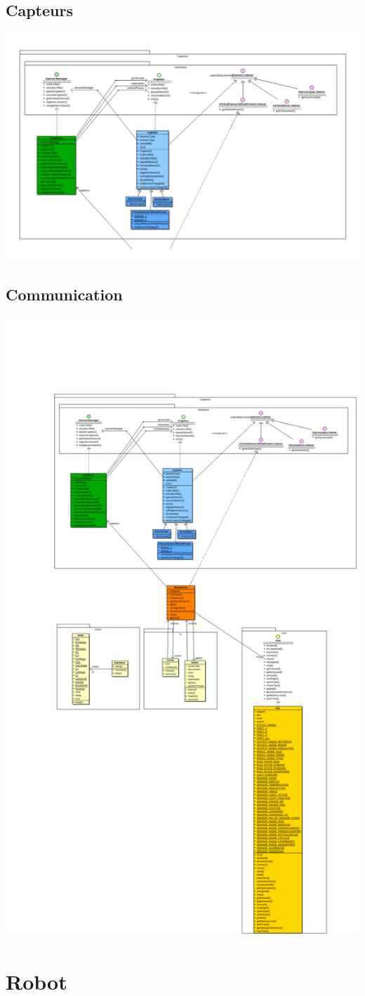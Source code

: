 \documentclass[10pt,a4paper]{article}
\begin{document}
	\subsection{Capteurs}
	\includegraphics[width=15 cm]{diagramme1.pdf} \\
	
	\subsection{Communication}
	\includegraphics[width=15 cm]{diagramme.pdf} \\

\section{Robot}
\end{document}
